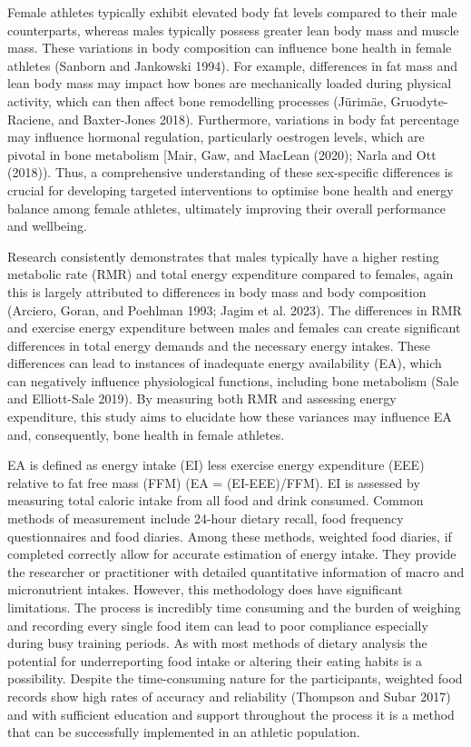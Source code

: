 \documentclass[
]{article}
\begin{document}
Female athletes typically exhibit elevated body fat levels compared to their male counterparts, whereas males typically possess greater lean body mass and muscle mass. These variations in body composition can influence bone health in female athletes (Sanborn and Jankowski 1994). For example, differences in fat mass and lean body mass may impact how bones are mechanically loaded during physical activity, which can then affect bone remodelling processes (Jürimäe, Gruodyte-Raciene, and Baxter-Jones 2018). Furthermore, variations in body fat percentage may influence hormonal regulation, particularly oestrogen levels, which are pivotal in bone metabolism {[}Mair, Gaw, and MacLean (2020); Narla and Ott (2018)). Thus, a comprehensive understanding of these sex-specific differences is crucial for developing targeted interventions to optimise bone health and energy balance among female athletes, ultimately improving their overall performance and wellbeing.

Research consistently demonstrates that males typically have a higher resting metabolic rate (RMR) and total energy expenditure compared to females, again this is largely attributed to differences in body mass and body composition (Arciero, Goran, and Poehlman 1993; Jagim et al. 2023). The differences in RMR and exercise energy expenditure between males and females can create significant differences in total energy demands and the necessary energy intakes. These differences can lead to instances of inadequate energy availability (EA), which can negatively influence physiological functions, including bone metabolism (Sale and Elliott-Sale 2019). By measuring both RMR and assessing energy expenditure, this study aims to elucidate how these variances may influence EA and, consequently, bone health in female athletes.

EA is defined as energy intake (EI) less exercise energy expenditure (EEE) relative to fat free mass (FFM) (EA = (EI-EEE)/FFM). EI is assessed by measuring total caloric intake from all food and drink consumed. Common methods of measurement include 24-hour dietary recall, food frequency questionnaires and food diaries. Among these methods, weighted food diaries, if completed correctly allow for accurate estimation of energy intake. They provide the researcher or practitioner with detailed quantitative information of macro and micronutrient intakes. However, this methodology does have significant limitations. The process is incredibly time consuming and the burden of weighing and recording every single food item can lead to poor compliance especially during busy training periods. As with most methods of dietary analysis the potential for underreporting food intake or altering their eating habits is a possibility. Despite the time-consuming nature for the participants, weighted food records show high rates of accuracy and reliability (Thompson and Subar 2017) and with sufficient education and support throughout the process it is a method that can be successfully implemented in an athletic population.
\end{document}
